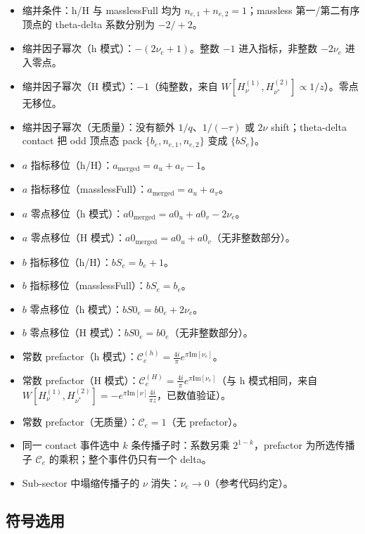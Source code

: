 ﻿\documentclass[a4paper,11pt]{article}
\begin{document}
\begin{itemize}
  \item 缩并条件：h/H 与 masslessFull 均为 $n_{e,1}+n_{e,2}=1$；massless 第一/第二有序顶点的 theta-delta 系数分别为 $-2/+2$。
  \item 缩并因子幂次（h 模式）：$-(2\nu_e+1)$。整数 $-1$ 进入指标，非整数 $-2\nu_e$ 进入零点。
  \item 缩并因子幂次（H 模式）：$-1$（纯整数，来自 $W[H_\nu^{(1)}, H_{\nu^*}^{(2)}] \propto 1/z$）。零点无移位。
  \item 缩并因子幂次（无质量）：没有额外 $1/q$、$1/(-\tau)$ 或 $2\nu$ shift；theta-delta contact 把 odd 顶点态 pack $\{b_e,n_{e,1},n_{e,2}\}$ 变成 $\{bS_e\}$。
  \item $a$ 指标移位（h/H）：$a_{\text{merged}} = a_u + a_v - 1$。
  \item $a$ 指标移位（masslessFull）：$a_{\text{merged}} = a_u + a_v$。
  \item $a$ 零点移位（h 模式）：$a0_{\text{merged}} = a0_u + a0_v - 2\nu_e$。
  \item $a$ 零点移位（H 模式）：$a0_{\text{merged}} = a0_u + a0_v$（无非整数部分）。
  \item $b$ 指标移位（h/H）：$bS_e=b_e+1$。
  \item $b$ 指标移位（masslessFull）：$bS_e=b_e$。
  \item $b$ 零点移位（h 模式）：$bS0_e = b0_e + 2\nu_e$。
  \item $b$ 零点移位（H 模式）：$bS0_e = b0_e$（无非整数部分）。
  \item 常数 prefactor（h 模式）：$\mathcal{C}_e^{(h)} = \frac{4i}{\pi} e^{\pi \text{Im}[\nu_e]}$。
  \item 常数 prefactor（H 模式）：$\mathcal{C}_e^{(H)} = \frac{4i}{\pi} e^{\pi \text{Im}[\nu_e]}$（与 h 模式相同，来自 $W[H_\nu^{(1)}, H_{\nu^*}^{(2)}] = -e^{\pi \text{Im}[\nu]} \frac{4i}{\pi z}$，已数值验证）。
  \item 常数 prefactor（无质量）：$\mathcal{C}_e = 1$（无 prefactor）。
  \item 同一 contact 事件选中 $k$ 条传播子时：系数另乘 $2^{1-k}$，prefactor 为所选传播子 $\mathcal C_e$ 的乘积；整个事件仍只有一个 delta。
  \item Sub-sector 中塌缩传播子的 $\nu$ 消失：$\nu_e \to 0$（参考代码约定）。
\end{itemize}

\subsection{符号选用}
\end{document}
